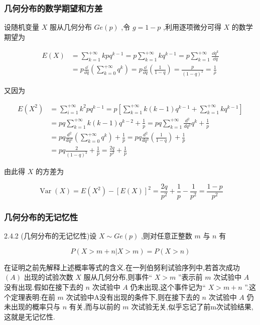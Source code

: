 \subsubsection{几何分布的数学期望和方差}

设随机变量 $ X $ 服从几何分布 $ Ge(p) $ ,令 $ g=1-p $ ,利用逐项微分可得 $ X $ 的数学期望为

\[
\begin{aligned} E(X) &=\sum_{k=1}^{+\infty} k p q^{k-1} =p \sum_{k=1}^{+\infty} k q^{k-1}=p \sum_{k=1}^{+\infty} \frac{\dd q^{k}}{\dd q} \\ &=p \frac{\dd}{\dd q}\left(\sum_{k=0}^{+\infty} q^{k}\right)=p \frac{\dd}{\dd q}\left(\frac{1}{1-q}\right)=\frac{p}{(1-q)^{2}}=\frac{1}{\rho} \end{aligned}
\]

又因为

\[
\begin{aligned} 
E\left(X^{2}\right) &=\sum_{i=1}^{+\infty} k^{2} p q^{k-1}=p\left[\sum_{k=1}^{+\infty} k(k-1) q^{k-1}+\sum_{k=1}^{+\infty} k q^{k-1}\right] \\ 
&=p q \sum_{k=1}^{+\infty} k(k-1) q^{k-2}+\frac{1}{p}=p q \sum_{k=1}^{+\infty} \frac{d^{2}}{d q^{2}} q^{k}+\frac{1}{p}\\
&  {=p q \frac{d^{2}}{d q^{2}}\left(\sum_{k=0}^{+\infty} q^{k}\right)+\frac{1}{p}=p q \frac{d^{2}}{d q^{2}}\left(\frac{1}{1-q}\right)+\frac{1}{p}}\\
& {=p q \frac{2}{(1-q)^{3}}+\frac{1}{p}=\frac{2 q}{p^{2}}+\frac{1}{p}}
\end{aligned}
\]

由此得 $ X $ 的方差为

\[
\operatorname{Var}(X)=E\left(X^{2}\right)-[E(X)]^{2}=\frac{2 q}{p^{2}}+\frac{1}{p}-\frac{1}{p^{2}}=\frac{1-p}{p^{2}}
\]


\subsubsection{几何分布的无记忆性}

\begin{theorem}{}{2.4.2}
	(几何分布的无记忆性)设 $ X \sim G e(p) $ ,则对任意正整数 $ m $ 与 $ n $ 有
	
	\begin{equation}
	P(X>m+n | X>m)=P(X>n) \label{eq:2.4.9}
	\end{equation}
\end{theorem}

在证明之前先解释上述概率等式的含义.在一列伯努利试验序列中,若首次成功 $ (A) $ 出现的试验次数 $ X $ 服从几何分布,则事件“ $ X>m $ ”表示前 $ m $ 次试验中 $ A $ 没有出现.假如在接下去的 $ n $ 次试验中 $ A $ 仍未出现,这个事件记为“ $ X>m+n $ ”.这个定理表明:在前 $ m $ 次试验中A没有出现的条件下,则在接下去的 $ n $ 次试验中 $ A $ 仍未出现的概率只与 $ n $ 有关,而与以前的 $ m $ 次试验无关,似乎忘记了前m次试验结果,这就是无记忆性.



